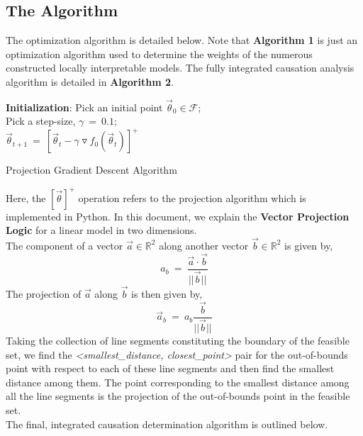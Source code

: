 \documentclass{article}
\begin{document}
\subsection{The Algorithm}
The optimization algorithm is detailed below. Note that \textbf{Algorithm 1} is just an optimization algorithm used to determine the weights of the numerous constructed locally interpretable models. The fully integrated causation analysis algorithm is detailed in \textbf{Algorithm 2}.
\begin{algorithm}[H]
\SetAlgoLined
\textbf{Initialization}: Pick an initial point $\vec{\theta}_0 \in \mathcal{F}$;
\\Pick a step-size, $\gamma\ =\ 0.1$;\\
{
    $\vec{\theta}_{t+1}\ =\ [\vec{\theta}_t - \gamma \triangledown f_0(\vec{\theta}_t)]^+$\;
}
\caption{Projection Gradient Descent Algorithm}
\end{algorithm}
Here, the $[\vec{\theta}]^+$ operation refers to the projection algorithm which is implemented in Python. In this document, we explain the \textbf{Vector Projection Logic} for a linear model in two dimensions.
\\The component of a vector $\vec{a} \in \mathbb{R}^2$ along another vector $\vec{b} \in \mathbb{R}^2$ is given by,
\[a_b\ =\ \frac{\vec{a} \cdot \vec{b}}{||\vec{b}||}\]
The projection of $\vec{a}$ along $\vec{b}$ is then given by,
\[\vec{a}_b\ =\ a_b \frac{\vec{b}}{||\vec{b}||}\]
Taking the collection of line segments constituting the boundary of the feasible set, we find the \textit{<smallest\_distance, closest\_point>} pair for the out-of-bounds point with respect to each of these line segments and then find the smallest distance among them. The point corresponding to the smallest distance among all the line segments is the projection of the out-of-bounds point in the feasible set.
\\The final, integrated causation determination algorithm is outlined below.
\end{document}
